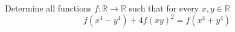 Determine all functions $f:\mathbb{R} \rightarrow \mathbb{R}$ such that for every $x,y \in \mathbb{R}$
$$f(x^{4}-y^{4})+4f(xy)^{2}=f(x^{4}+y^{4})$$